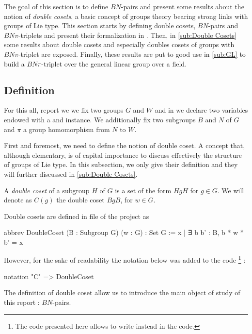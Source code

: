 The goal of this section is to define $BN$-pairs and present some results about the notion of \emph{double cosets}, a basic concept of groups theory bearing strong links with groups of Lie type. This section starts by defining double cosets, $BN$-pairs and $BN\pi$-triplets and present their formalization in \Lean. Then, in \ref{sub:Double Cosets} some results about double cosets and especially doubles cosets of groups with $BN\pi$-triplet are exposed. Finally, these results are put to good use in \ref{sub:GL} to build a $BN\pi$-triplet over the general linear group over a field.

\subsection{Definition}%

\label{sub:Definition}

For this all, report we we fix two groups $G$ and $W$ and in \Lean we declare two variables  endowed with a \lean{[Group G]} and \lean{[Group W]} instance. We additionally fix two subgroups $B$ and $N$ of $G$ and $\pi$ a group homomorphism from $N$ to $W$.

First and foremost, we need to define the notion of double coset. A concept that, although elementary, is of capital importance to discuss effectively the structure of groups of Lie type. In this subsection, we only give their definition and they will further discussed in \ref{sub:Double Cosets}.

\begin{definition} \label{def:DC}
    A \emph{double coset} of a subgroup $H$ of $G$ is a set of the form $HgH$ for $g \in G$. We  will denote as $C\left( g \right)$ the double coset $BgB$, for $w \in G$. \end{definition} 

    Double cosets are defined in  file of the project as
    \begin{leancode}
abbrev DoubleCoset (B : Subgroup G) (w : G) : Set G := 
    {x | ∃ b  b' : B, b * w * b' = x}
    \end{leancode} 
    However, for the sake of readability the notation below was added to the code \footnote{The code presented here allows to write  instead  in the code.} :
\begin{leancode}
notation "C"  => DoubleCoset 
\end{leancode}

The definition of double coset allow us to introduce the main object of study of this report : $BN$-pairs. 

